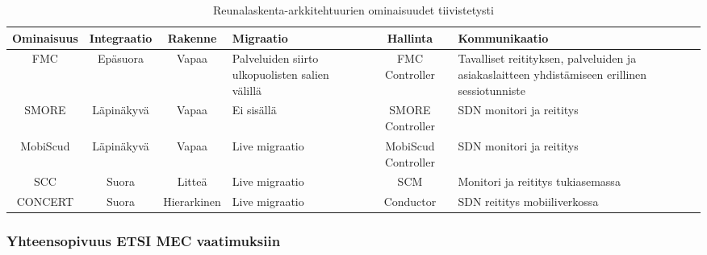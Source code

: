 \begin{landscape}
    \noindent
\begin{table}[!ht]
\caption{Reunalaskenta-arkkitehtuurien ominaisuudet tiivistetysti}
\label{table:features}
\begin{tabularx}{ \hsize }{ | c | c | c | p{3cm} | c | X | }
\hline 
 \textbf{Ominaisuus} & \textbf{Integraatio} & \textbf{Rakenne} & \textbf{Migraatio} & \textbf{Hallinta} & \textbf{Kommunikaatio} \\ 
\hline 
 FMC & Epäsuora & Vapaa & Palveluiden siirto ulkopuolisten salien välillä & FMC Controller & Tavalliset reitityksen, palveluiden ja asiakaslaitteen yhdistämiseen erillinen sessiotunniste \\ 
\hline 
 SMORE & Läpinäkyvä & Vapaa & Ei sisällä & SMORE Controller & SDN monitori ja reititys \\ 
\hline 
MobiScud & Läpinäkyvä & Vapaa & Live migraatio & MobiScud Controller & SDN monitori ja reititys\\ 
\hline 
SCC & Suora & Litteä & Live migraatio & SCM & Monitori ja reititys tukiasemassa \\ 
\hline 
CONCERT & Suora & Hierarkinen & Live migraatio & Conductor & SDN reititys mobiiliverkossa \\ 
\hline 
\end{tabularx} 
\end{table}
\end{landscape}

\subsubsection{Yhteensopivuus ETSI MEC vaatimuksiin}



